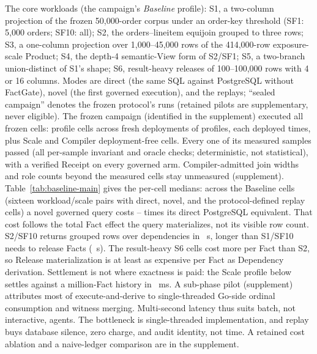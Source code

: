 \documentclass[10pt,journal,compsoc]{IEEEtran}
\newcommand{\system}{FactGate\xspace}
\begin{document}
The core workloads (the campaign's \emph{Baseline} profile): S1, a
two-column projection of the frozen 50,000-order corpus under an order-key
threshold (SF1: 5,000 orders; SF10: all); S2, the orders--lineitem equijoin
grouped to three rows; S3, a one-column projection over 1,000--45,000 rows
of the 414,000-row exposure-scale Product; S4, the depth-4 semantic-View
form of S2/SF1; S5, a two-branch union-distinct of S1's shape; S6,
result-heavy releases of 100--100,000 rows with 4 or 16 columns. Modes
are direct (the same SQL against PostgreSQL without \system), novel (the first
governed execution), and the replays; ``sealed campaign'' denotes the frozen
protocol's runs (retained pilots are supplementary, never eligible). The frozen
campaign (identified in the supplement) executed all
\FinalVFivePublicationTotalCells{} frozen cells:
\FinalVFivePublicationProfileCells{} profile cells across
\FinalVFivePublicationDeployments{} fresh deployments of
\FinalVFivePublicationProfiles{} profiles, each deployed
\FinalVFivePublicationFreshExecutions{} times, plus
\FinalVFivePublicationScaleNonProfileCells{} Scale and
\FinalVFivePublicationCompilerNonProfileCells{} Compiler deployment-free
cells. Every one of its \FinalVFivePublicationMeasuredSamples{} measured
samples passed (all per-sample invariant and oracle checks; deterministic,
not statistical), with a verified Receipt on every governed arm.
Compiler-admitted join widths and role counts beyond the measured cells
stay unmeasured (supplement).
Table~\ref{tab:baseline-main} gives
the per-cell medians: across the \FinalVFivePublicationBaselineCells{}
Baseline cells (sixteen workload/scale pairs with direct, novel, and the
protocol-defined replay cells) a novel governed query costs
\FinalVFivePublicationOverheadMin{}--\FinalVFivePublicationOverheadMax{}
times its direct PostgreSQL equivalent. That cost follows the total Fact
effect the query materializes, not its visible row count. S2/SF10 returns
\FinalVFivePublicationSTwoRows{} grouped rows over
\FinalVFivePublicationSTwoDependencyFacts{} dependencies in
\FinalVFivePublicationSTwoNovelS{}~s, longer than S1/SF10 needs to release
\FinalVFivePublicationSOneReleaseFacts{} Facts
(\FinalVFivePublicationSOneNovelS{}~s). The result-heavy S6 cells cost
more per Fact than S2, so Release materialization is at least as expensive
per Fact as Dependency derivation. Settlement is not where exactness is
paid: the Scale profile below settles against a million-Fact history in
\FinalVFivePublicationScaleSettleMillionMS{}~ms. A sub-phase pilot (supplement) attributes most of execute-and-derive to
single-threaded Go-side ordinal consumption and witness merging.
Multi-second latency thus suits batch, not interactive, agents.
The bottleneck is single-threaded implementation, and replay buys database
silence, zero charge, and audit identity, not time. A retained cost ablation and a naive-ledger comparison are in the supplement.
\end{document}
